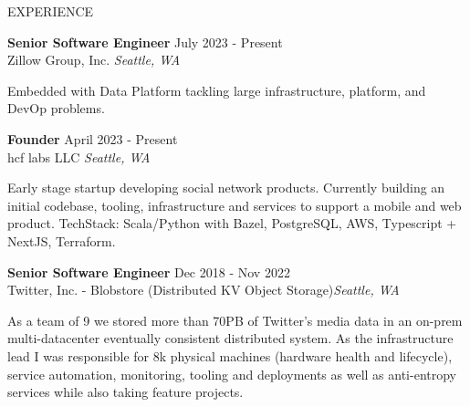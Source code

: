 

\begin{rSection}{EXPERIENCE}
\begin{mdframed}[linewidth=2,linecolor=blue, innertopmargin=1em, innerbottommargin=1em, topline=false, rightline=false, bottomline=false]
\textbf{Senior Software Engineer} \hfill July 2023 - Present\\
Zillow Group, Inc. \hfill \textit{Seattle, WA}

Embedded with Data Platform tackling large infrastructure, platform, and DevOp problems. 
\end{mdframed}

\begin{mdframed}[linewidth=2,linecolor=red, innertopmargin=1em, innerbottommargin=1em, topline=false, rightline=false, bottomline=false]
\textbf{Founder} \hfill April 2023 - Present\\
hcf labs LLC \hfill \textit{Seattle, WA}

Early stage startup developing social network products. Currently building an initial codebase, tooling, infrastructure and services to support a mobile and web product. TechStack: Scala/Python with Bazel, PostgreSQL, AWS, Typescript + NextJS, Terraform.
\end{mdframed}

\begin{mdframed}[linewidth=2,linecolor=blue, innertopmargin=1em, innerbottommargin=1em, topline=false, rightline=false, bottomline=false]
\textbf{Senior Software Engineer} \hfill Dec 2018 - Nov 2022\\
Twitter, Inc. - Blobstore (Distributed KV Object Storage)\hfill \textit{Seattle, WA}

As a team of 9 we stored more than 70PB of Twitter's media data in an on-prem multi-datacenter eventually consistent distributed system. As the infrastructure lead I was responsible for 8k physical machines (hardware health and lifecycle), service automation, monitoring, tooling and deployments as well as anti-entropy services while also taking feature projects. 


\end{mdframed}
\end{rSection}
